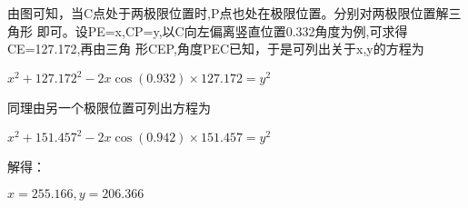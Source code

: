\documentclass{ctexart}%
\begin{document}
由图可知，当C点处于两极限位置时,P点也处在极限位置。分别对两极限位置解三角形%
即可。设PE=x,CP=y,以C向左偏离竖直位置0.332角度为例,可求得CE=127.172,再由三角%
形CEP,角度PEC已知，于是可列出关于x,y的方程为

$x^{2}+127.172^{2}-2x\cos(0.932)\times127.172=y^{2}$

同理由另一个极限位置可列出方程为

$x^{2}+151.457^{2}-2x\cos(0.942)\times151.457=y^{2}$

解得：

$x=255.166,y=206.366$
\end{document}
